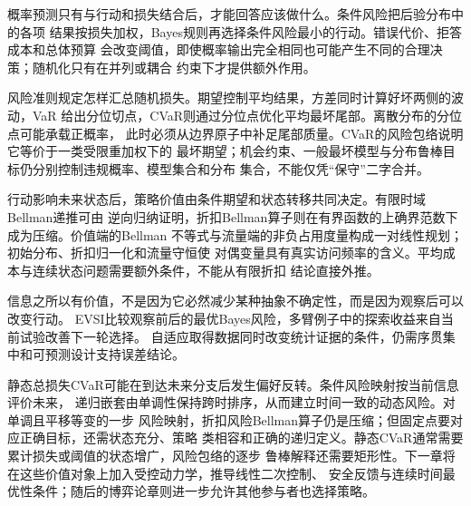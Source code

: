 概率预测只有与行动和损失结合后，才能回答应该做什么。条件风险把后验分布中的各项
结果按损失加权，Bayes规则再选择条件风险最小的行动。错误代价、拒答成本和总体预算
会改变阈值，即使概率输出完全相同也可能产生不同的合理决策；随机化只有在并列或耦合
约束下才提供额外作用。

风险准则规定怎样汇总随机损失。期望控制平均结果，方差同时计算好坏两侧的波动，VaR
给出分位切点，CVaR则通过分位点优化平均最坏尾部。离散分布的分位点可能承载正概率，
此时必须从边界原子中补足尾部质量。CVaR的风险包络说明它等价于一类受限重加权下的
最坏期望；机会约束、一般最坏模型与分布鲁棒目标仍分别控制违规概率、模型集合和分布
集合，不能仅凭“保守”二字合并。

行动影响未来状态后，策略价值由条件期望和状态转移共同决定。有限时域Bellman递推可由
逆向归纳证明，折扣Bellman算子则在有界函数的上确界范数下成为压缩。价值端的Bellman
不等式与流量端的非负占用度量构成一对线性规划；初始分布、折扣归一化和流量守恒使
对偶变量具有真实访问频率的含义。平均成本与连续状态问题需要额外条件，不能从有限折扣
结论直接外推。

信息之所以有价值，不是因为它必然减少某种抽象不确定性，而是因为观察后可以改变行动。
EVSI比较观察前后的最优Bayes风险，多臂例子中的探索收益来自当前试验改善下一轮选择。
自适应取得数据同时改变统计证据的条件，仍需序贯集中和可预测设计支持误差结论。

静态总损失CVaR可能在到达未来分支后发生偏好反转。条件风险映射按当前信息评价未来，
递归嵌套由单调性保持跨时排序，从而建立时间一致的动态风险。对单调且平移等变的一步
风险映射，折扣风险Bellman算子仍是压缩；但固定点要对应正确目标，还需状态充分、策略
类相容和正确的递归定义。静态CVaR通常需要累计损失或阈值的状态增广，风险包络的逐步
鲁棒解释还需要矩形性。下一章将在这些价值对象上加入受控动力学，推导线性二次控制、
安全反馈与连续时间最优性条件；随后的博弈论章则进一步允许其他参与者也选择策略。
